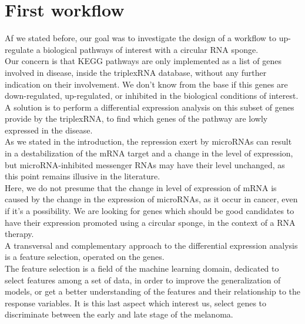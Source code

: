\documentclass[a4paper,12pt]{report}
\begin{document}
\section{First workflow}

Af we stated before, our goal was to investigate the design of a workflow to up-regulate a biological pathways of interest with a circular RNA sponge.\\

Our concern is that KEGG pathways are only implemented as a list of genes involved in disease, inside the triplexRNA database\cite{triplex}, without any further indication on their involvement. We don't know from the base if this genes are down-regulated, up-regulated, or inhibited in the biological conditions of interest.\\

A solution is to perform a differential expression analysis on this subset of genes provide by the triplexRNA, to find which genes of the pathway are lowly expressed in the disease.\\

As we stated in the introduction, the repression exert by microRNAs can result in a destabilization of the mRNA target and a change in the level of expression, but microRNA-inhibited messenger RNAs may have their level unchanged, as this point remains illusive in the literature\cite{cancer}.\\

Here, we do not presume that the change in level of expression of mRNA is caused by the change in the expression of microRNAs, as it occur in cancer\cite{cancer}, even if it's a possibility. We are looking for genes which should be good candidates to have their expression promoted using a circular sponge, in the context of a RNA therapy.\\

A transversal and complementary approach to the differential expression analysis is a feature selection, operated on the genes.\\

The feature selection is a field of the machine learning domain\cite{springer}, dedicated to select features among a set of data, in order to improve the generalization of models, or get a better understanding of the features and their relationship to the response variables\cite{springer}. It is this last aspect which interest us, select genes to discriminate between the early and late stage of the melanoma.\\
\end{document}
